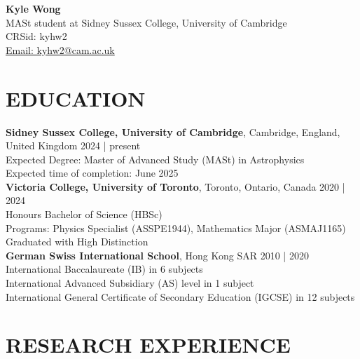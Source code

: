 \documentclass[a4paper,10pt]{extarticle}
\begin{document}
\pagestyle{fancy}
\renewcommand{\headrulewidth}{0pt}
\fancyhead{}
\thispagestyle{empty} %

\begin{flushleft}
\textbf{\LARGE Kyle Wong}\\[2pt] %
MASt student at Sidney Sussex College, University of Cambridge
\\ {CRSid: kyhw2} \\
\href{mailto:kyleyh.wong@mail.utoronto.ca}{Email: kyhw2@cam.ac.uk} %
\end{flushleft}

\section*{EDUCATION}
\textbf{Sidney Sussex College, University of Cambridge}, Cambridge, England, United Kingdom \hfill 2024 | present\\
Expected Degree: Master of Advanced Study (MASt) in Astrophysics\\
Expected time of completion: June 2025\\



\textbf{Victoria College, University of Toronto}, Toronto, Ontario, Canada \hfill 2020 | 2024\\ %
Honours Bachelor of Science (HBSc)\\
Programs: Physics Specialist (ASSPE1944), Mathematics Major (ASMAJ1165)\\ 
Graduated with High Distinction\\


\textbf{German Swiss International School}, Hong Kong SAR \hfill 2010 | 2020\\ %
International Baccalaureate (IB) in 6 subjects\\
International Advanced Subsidiary (AS) level in 1 subject\\
International General Certificate of Secondary Education (IGCSE) in 12 subjects

\section*{RESEARCH EXPERIENCE}
\end{document}
